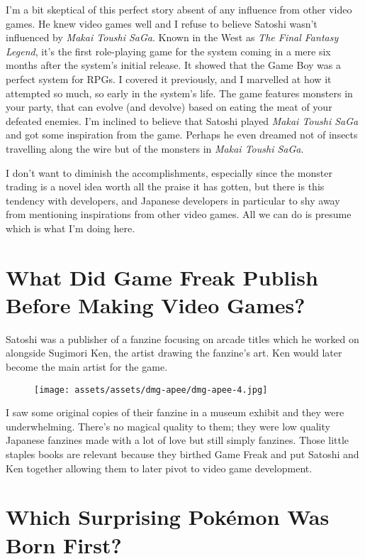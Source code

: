 \documentclass{book}
\begin{document}
I’m a bit skeptical of this perfect story absent of any influence from other video games. He knew video games well and I refuse to believe Satoshi wasn’t influenced by \emph{Makai Toushi SaGa}. Known in the West as \emph{The Final Fantasy Legend}, it’s the first role-playing game for the system coming in a mere six months after the system’s initial release. It showed that the Game Boy was a perfect system for RPGs. I covered it previously, and I marvelled at how it attempted so much, so early in the system’s life. The game features monsters in your party, that can evolve (and devolve) based on eating the meat of your defeated enemies. I’m inclined to believe that Satoshi played \emph{Makai Toushi SaGa} and got some inspiration from the game. Perhaps he even dreamed not of insects travelling along the wire but of the monsters in \emph{Makai Toushi SaGa}.

I don’t want to diminish the accomplishments, especially since the monster trading is a novel idea worth all the praise it has gotten, but there is this tendency with developers, and Japanese developers in particular to shy away from mentioning inspirations from other video games. All we can do is presume which is what I’m doing here.

\FloatBarrier\needspace{10mm}\section*{What Did Game Freak Publish Before Making Video Games?}\nopagebreak[4]

Satoshi was a publisher of a fanzine focusing on arcade titles which he worked on alongside Sugimori Ken, the artist drawing the fanzine’s art. Ken would later become the main artist for the game.

\begin{figure}[hbt]
\vskip 10pt
\centering \texttt{[image: assets/assets/dmg-apee/dmg-apee-4.jpg]}
\vskip 6pt
\end{figure}

I saw some original copies of their fanzine in a museum exhibit and they were underwhelming. There’s no magical quality to them; they were low quality Japanese fanzines made with a lot of love but still simply fanzines. Those little staples books are relevant because they birthed Game Freak and put Satoshi and Ken together allowing them to later pivot to video game development.

\FloatBarrier\needspace{10mm}\section*{Which Surprising Pokémon Was Born First?}\nopagebreak[4]
\end{document}
